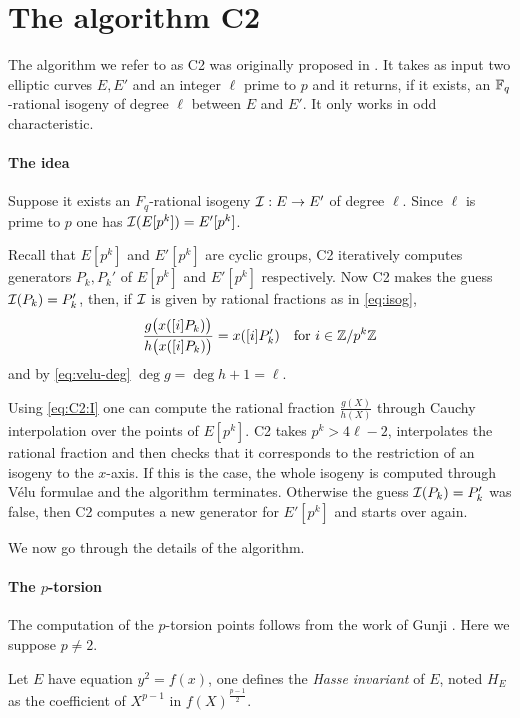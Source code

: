 \section{The algorithm C2}

The algorithm we refer to as C2 was originally proposed in
\cite{Cou96}. It takes as input two elliptic curves $E, E'$ and an
integer $\ell$ prime to $p$ and it returns, if it exists, an
$\mathbb{F}_q$-rational isogeny of degree $\ell$ between $E$ and $E'$. It only
works in odd characteristic.

\paragraph{The idea} Suppose it exists an $F_q$-rational isogeny
$\mathcal{I}:E\rightarrow E'$ of degree $\ell$. Since $\ell$ is prime to $p$
one has $\mathcal{I}(E[p^k]) = E'[p^k]$.

Recall that $E[p^k]$ and $E'[p^k]$ are cyclic groups, C2 iteratively
computes generators $P_k,P_k'$ of $E[p^k]$ and $E'[p^k]$
respectively. Now C2 makes the guess $\mathcal{I}(P_k) = P_k'$, then, if $\mathcal{I}$
is given by rational fractions as in \eqref{eq:isog},
\begin{equation}
  \label{eq:C2:I}
  \frac{g\bigl(x([i]P_k)\bigr)}{h\bigl(x([i]P_k)\bigr)} = x([i]P_k')
  \quad\text{for $i\in\mathbb{Z}/p^k\mathbb{Z}$} 
\end{equation}
and by \eqref{eq:velu-deg} $\deg g = \deg h + 1 = \ell$.

Using \eqref{eq:C2:I} one can compute the rational fraction
$\frac{g(X)}{h(X)}$ through Cauchy interpolation over the points of
$E[p^k]$. C2 takes $p^k > 4\ell - 2$, interpolates the rational
fraction and then checks that it corresponds to the restriction of an
isogeny to the $x$-axis. If this is the case, the whole isogeny is
computed through Vélu formulae and the algorithm terminates. Otherwise
the guess $\mathcal{I}(P_k) = P_k'$ was false, then C2 computes a new generator
for $E'[p^k]$ and starts over again.

We now go through the details of the algorithm.

\paragraph{The $p$-torsion}
The computation of the $p$-torsion points follows from the work of
Gunji \cite{Gun76}. Here we suppose $p\ne2$.

\begin{definition}
  \label{def:hasse}
  Let $E$ have equation $y^2 = f(x)$, one defines the \emph{Hasse
    invariant} of $E$, noted $H_E$ as the coefficient of $X^{p-1}$ in
  $f(X)^{\frac{p-1}{2}}$.
\end{definition}

